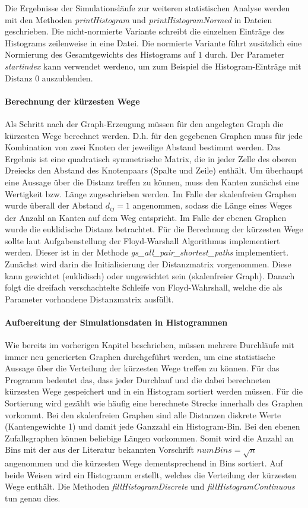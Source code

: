 \documentclass[10pt]{article}
\begin{document}
Die Ergebnisse der Simulationsläufe zur weiteren statistischen Analyse werden mit den Methoden \textit{printHistogram} und \textit{printHistogramNormed} in Dateien geschrieben. Die nicht-normierte Variante schreibt die einzelnen Einträge des Histograms zeilenweise in eine Datei. Die normierte Variante führt zusätzlich eine Normierung des Gesamtgewichts des Histograms auf $1$ durch. Der Parameter \textit{startindex} kann verwendet werdeno, um zum Beispiel die Histogram-Einträge mit Distanz 0 auszublenden.

\paragraph{Berechnung der kürzesten Wege}
Als Schritt nach der Graph-Erzeugung müssen für den angelegten Graph die kürzesten Wege berechnet werden. D.h. für den gegebenen Graphen muss für jede Kombination von zwei Knoten der jeweilige Abstand bestimmt werden. Das Ergebnis ist eine quadratisch symmetrische Matrix, die in jeder Zelle des oberen Dreiecks den Abstand des Knotenpaars (Spalte und Zeile) enthält. 
Um überhaupt eine Aussage über die Distanz treffen zu können, muss den Kanten zunächst eine Wertigkeit bzw. Länge zugeschrieben werden. Im Falle der skalenfreien Graphen wurde überall der Abstand $d_{ij}=1$ angenommen, sodass die Länge eines Weges der Anzahl an Kanten auf dem Weg entspricht. Im Falle der ebenen Graphen wurde die euklidische Distanz betrachtet. Für die Berechnung der kürzesten Wege sollte laut Aufgabenstellung der Floyd-Warshall Algorithmus implementiert werden. Dieser ist in der Methode \textit{gs\_all\_pair\_shortest\_paths} implementiert. Zunächst wird darin die Initialisierung der Distanzmatrix vorgenommen. Diese kann gewichtet (euklidisch) oder ungewichtet sein (skalenfreier Graph). Danach folgt die dreifach verschachtelte Schleife von Floyd-Wahrshall, welche die als Parameter vorhandene Distanzmatrix ausfüllt.

\paragraph{Aufbereitung der Simulationsdaten in Histogrammen}
Wie bereits im vorherigen Kapitel beschrieben, müssen mehrere Durchläufe mit immer neu generierten Graphen durchgeführt werden, um eine statistische Aussage über die Verteilung der kürzesten Wege treffen zu können. Für das Programm bedeutet das, dass jeder Durchlauf und die dabei berechneten kürzesten Wege gespeichert und in ein Histogram sortiert werden müssen. Für die Sortierung wird gezählt wie häufig eine berechnete Strecke innerhalb des Graphen vorkommt. Bei den skalenfreien Graphen sind alle Distanzen diskrete Werte (Kantengewichte 1) und damit jede Ganzzahl ein Histogram-Bin. Bei den ebenen Zufallsgraphen können beliebige Längen vorkommen. Somit wird die Anzahl an Bins mit der aus der Literatur bekannten Vorschrift $numBins=\sqrt{n}$ angenommen und die kürzesten Wege dementsprechend in Bins sortiert.
Auf beide Weisen wird ein Histogramm erstellt, welches die Verteilung der kürzesten Wege enthält. Die Methoden \textit{fillHistogramDiscrete} und \textit{fillHistogramContinuous} tun genau dies.
\end{document}
